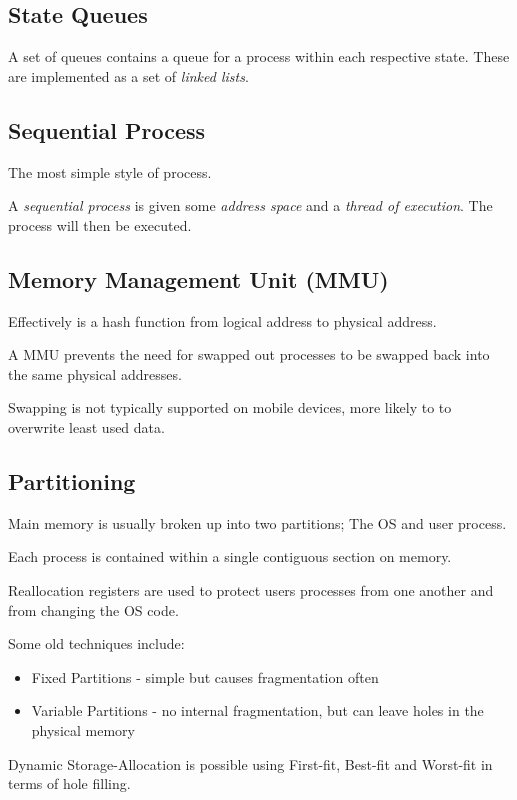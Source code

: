 \documentclass[a4]{article}
\begin{document}
\subsection{State Queues}

A set of queues contains a queue for a process within each respective state. These are implemented as a set of \textit{linked lists}. 

\subsection{Sequential Process}

The most simple style of process.

A \textit{sequential process} is given some \textit{address space} and a \textit{thread of execution}. The process will then be executed.

\subsection{Memory Management Unit (MMU)}
Effectively is a hash function from logical address to physical address.

A MMU prevents the need for swapped out processes to be swapped back into the same physical addresses.

Swapping is not typically supported on mobile devices, more likely to to overwrite least used data.


\subsection{Partitioning}
Main memory is usually broken up into two partitions; The OS and user process.

Each process is contained within a single contiguous section on memory.

Reallocation registers are used to protect users processes from one another and from changing the OS code.

Some old techniques include:
\begin{itemize}
    \item Fixed Partitions - simple but causes fragmentation often
    \item Variable Partitions - no internal fragmentation, but can leave holes in the physical memory
\end{itemize}

Dynamic Storage-Allocation is possible using First-fit, Best-fit and Worst-fit in terms of hole filling.
\end{document}
